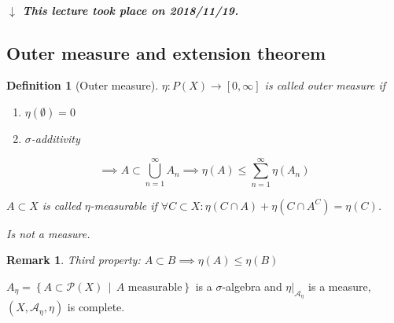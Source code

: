 \documentclass[a4paper]{article}
\newcounter{lecref}[section]
\numberwithin{lecref}{section}
\theoremstyle{break}
\newtheorem{definition}[lecref]{Definition}
\newtheorem*{Remark}{Remark}
\newcommand{\dateref}[1]{%
  \begin{mdframed}[backgroundcolor=gray!10,innerbottommargin=0pt,innertopmargin=0pt]
    \paragraph{\textit{$\downarrow$ This lecture took place on #1.}}%
  \end{mdframed}%
}
\newcommand{\SetDef}[2]{\left\{#1\,\mid\,#2\right\}}
\begin{document}
\dateref{2018/11/19}

\subsection{Outer measure and extension theorem}
\begin{definition}[Outer measure]
  $\eta: P(X) \to [0, \infty]$ is called \emph{outer measure} if
  \begin{enumerate}
    \item $\eta(\emptyset) = 0$
    \item $\sigma$-additivity
  \end{enumerate}
  \[ \implies A \subset \bigcup_{n=1}^\infty A_n \implies \eta(A) \leq \sum_{n=1}^\infty \eta(A_n) \]

  $A \subset X$ is called $\eta$-measurable if $\forall C \subset X: \eta(C \cap A) + \eta(C \cap A^C) = \eta(C)$.

  Is not a measure.
\end{definition}

\begin{Remark}
  Third property: $A \subset B \implies \eta(A) \leq \eta(B)$
\end{Remark}

\begin{theorem}[Carathéodory]
  $A_\eta = \SetDef{A \subset \mathcal P(X)}{A \text{ measurable}}$ is a $\sigma$-algebra and $\left.\eta\right|_{\mathcal A_{\eta}}$ is a measure, $(X, \mathcal A_\eta, \eta)$ is complete.
\end{theorem}
\end{document}
